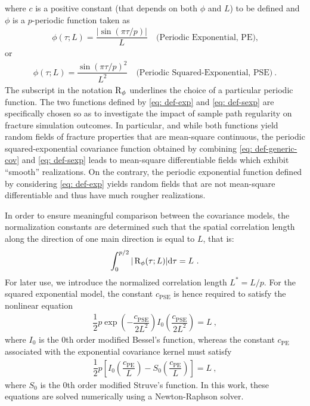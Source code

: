 where $c$ is a positive constant (that depends on both $\phi$ and $L$) to be defined and $\phi$ is a $p$-periodic function taken as
\begin{align}
  \phi(\tau; L) = \dfrac{|\sin\left( \pi\tau/p \right)|}{L} \quad \text{(Periodic Exponential, PE),} \label{eq: def-exp}
\end{align}
or
\begin{align}
  \phi(\tau; L) = \dfrac{\sin\left( \pi\tau/p \right)^2}{L^2} \quad \text{(Periodic Squared-Exponential, PSE)}~. \label{eq: def-sexp}
\end{align}
The subscript in the notation $\operatorname{R}_\phi$ underlines the choice of a particular periodic function. The two functions defined by \eqref{eq: def-exp} and \eqref{eq: def-sexp} are specifically chosen so as to investigate the impact of sample path regularity on fracture simulation outcomes. In particular, and while both functions yield random fields of fracture properties that are mean-square continuous, the periodic squared-exponential covariance function obtained by combining \eqref{eq: def-generic-cov} and \eqref{eq: def-sexp} leads to mean-square differentiable fields which exhibit ``smooth'' realizations. On the contrary, the periodic exponential function defined by considering \eqref{eq: def-exp} yields random fields that are not mean-square differentiable and thus have much rougher realizations.

In order to ensure meaningful comparison between the covariance models, the normalization constants are determined such that the spatial correlation length along the direction of one main direction is equal to $L$, that is:
\begin{align}
  \int_0^{p/2} |\operatorname{R}_\phi(\tau; L)| \mathrm{d}\tau = L~.
\end{align}
For later use, we introduce the normalized correlation length $L^* = L/p$. For the squared exponential model, the constant $c^{}_\text{PSE}$ is hence required to satisfy the nonlinear equation
\begin{align}
  \dfrac{1}{2}p\exp\left( -\dfrac{c^{}_\text{PSE}}{2L^2} \right)I_0(\dfrac{c^{}_\text{PSE}}{2L^2}) = L~, \label{eq: pse normalization}
\end{align}
where $I_0$ is the 0th order modified Bessel's function, whereas the constant $c^{}_\text{PE}$ associated with the exponential covariance kernel must satisfy
\begin{align}
  \dfrac{1}{2}p\left[ I_0\left(\dfrac{c^{}_\text{PE}}{L}\right) - S_0\left(\dfrac{c^{}_\text{PE}}{L}\right) \right] = L~, \label{eq: se normalization}
\end{align}
where $S_0$ is the 0th order modified Struve's function.
In this work, these equations are solved numerically using a Newton-Raphson solver.

